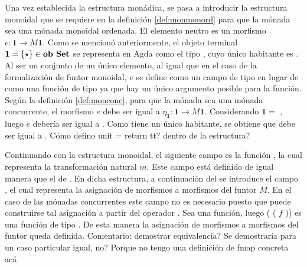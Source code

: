 Una vez establecida la estructura monádica, se pasa a introducir la estructura monoidal que se requiere en la definición \ref{def:monmonord} para que la mónada sea una mónada monoidal ordenada. El elemento neutro es un morfismo $e : \mathbf{1} \rightarrow \mathit{M} \mathbf{1}$. Como se mencionó anteriormente, el objeto terminal $\mathbf{1} = \{\star\} \in \text{\bf ob Set}$ se representa en Agda como el tipo \AgdaDatatype{$\top$}, cuyo único habitante es . Al ser un conjunto de un único elemento, al igual que en el caso de la formalización de funtor monoidal, $e$ se define como un campo  de tipo  \AgdaDatatype{$\top$} en lugar de como una función de tipo \AgdaDatatype{$\top$} \AgdaSymbol{$\rightarrow$}  \AgdaDatatype{$\top$} ya que hay un único argumento posible para la función. Según la definición \ref{def:monconc}, para que la mónada sea una mónada concurrente, el morfismo $e$ debe ser igual a $\eta_{\mathbf{1}} : \mathbf{1} \rightarrow \mathit{M} \mathbf{1}$. Considerando $\mathbf{1} =$ \AgdaDatatype{$\top$}, luego $e$ debería ser igual a  \AgdaSymbol{\{}\AgdaDatatype{$\top$}\AgdaSymbol{\} :} \AgdaDatatype{$\top$} \AgdaSymbol{$\rightarrow$}  \AgdaDatatype{$\top$}. Como \AgdaDatatype{$\top$} tiene un único habitante, se obtiene que  debe ser igual a   \AgdaSymbol{:}  \AgdaDatatype{$\top$}. {\color{red} Cómo defino unit = return tt? dentro de la estructura?}

Continuando con la estructura monoidal, el siguiente campo es la función , la cual representa la transformación natural $m$. Este campo está definido de igual manera que el  de . En dicha estructura, a continuación del  se introduce el campo , el cual representa la asignación de morfismos a morfismos del funtor $\mathit{M}$. En el caso de las mónadas concurrentes este campo no es necesario puesto que puede construirse tal asignación a partir del operador \AgdaField{$\gg=$}. Sea  \AgdaSymbol{:}  \AgdaSymbol{$\rightarrow$}   una función, luego (\AgdaSymbol{$\lambda$}  \AgdaSymbol{$\rightarrow$}  \AgdaField{$\gg=$} (\AgdaSymbol{$\lambda$}  \AgdaSymbol{$\rightarrow$}  $f$ )) es una función de tipo  \AgdaSymbol{$\rightarrow$} . De esta manera la asignación de morfismos a morfismos del funtor queda definida. {\color{red} Comentario: demostrar equivalencia? Se demostraría para un caso particular igual, no? Porque no tengo una definición de fmap concreta acá} 

